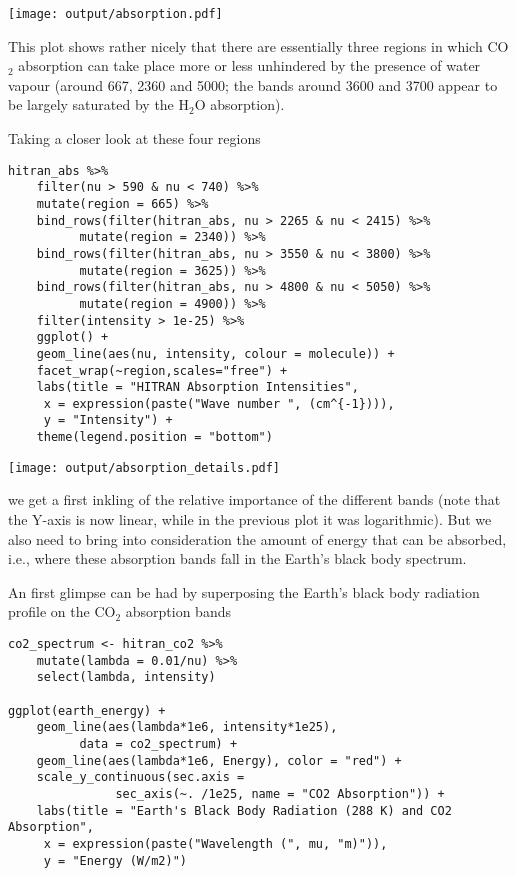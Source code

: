 \documentclass[10pt,a4paper,titlepage]{article}
\begin{document}
\texttt{[image: output/absorption.pdf]}

This plot shows rather nicely that there are essentially three regions
in which CO$_{\text{2}}$ absorption can take place more or less unhindered by
the presence of water vapour (around 667, 2360 and
\unit{5000}{\centi\reciprocal\metre}; the bands around 3600 and
\unit{3700}{\centi\reciprocal\metre} appear to be largely saturated by
the H$_{\text{2}}$O absorption).

Taking a closer look at these four regions
\begin{lstlisting}
hitran_abs %>%
    filter(nu > 590 & nu < 740) %>%
    mutate(region = 665) %>%
    bind_rows(filter(hitran_abs, nu > 2265 & nu < 2415) %>%
	      mutate(region = 2340)) %>%
    bind_rows(filter(hitran_abs, nu > 3550 & nu < 3800) %>%
	      mutate(region = 3625)) %>%
    bind_rows(filter(hitran_abs, nu > 4800 & nu < 5050) %>%
	      mutate(region = 4900)) %>%
    filter(intensity > 1e-25) %>%
    ggplot() +
    geom_line(aes(nu, intensity, colour = molecule)) +
    facet_wrap(~region,scales="free") +
    labs(title = "HITRAN Absorption Intensities",
	 x = expression(paste("Wave number ", (cm^{-1}))),
	 y = "Intensity") +
    theme(legend.position = "bottom")
\end{lstlisting}

\texttt{[image: output/absorption\_details.pdf]}

we get a first inkling of the relative importance of the different
bands (note that the Y-axis is now linear, while in the previous plot
it was logarithmic). But we also need to bring into consideration the
amount of energy that can be absorbed, i.e., where these absorption
bands fall in the Earth's black body spectrum.

An first glimpse can be had by superposing the Earth's black body
radiation profile on the CO$_{\text{2}}$ absorption bands

\begin{lstlisting}
co2_spectrum <- hitran_co2 %>%
    mutate(lambda = 0.01/nu) %>%
    select(lambda, intensity)

ggplot(earth_energy) +
    geom_line(aes(lambda*1e6, intensity*1e25),
	      data = co2_spectrum) +
    geom_line(aes(lambda*1e6, Energy), color = "red") +
    scale_y_continuous(sec.axis =
			   sec_axis(~. /1e25, name = "CO2 Absorption")) +
    labs(title = "Earth's Black Body Radiation (288 K) and CO2 Absorption",
	 x = expression(paste("Wavelength (", mu, "m)")),
	 y = "Energy (W/m2)")
\end{lstlisting}
\end{document}
